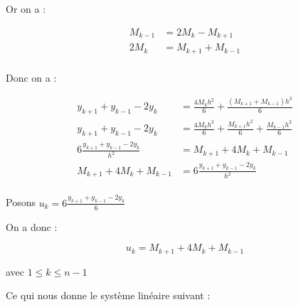 \documentclass[12pt, letterpaper]{article}
\begin{document}
\begin{enumerate}
\begin{enumerate}
    Or on a :

    \begin{equation*}
      \begin{split}
        M_{k - 1} & = 2 M_k - M_{k + 1} \\
        2 M_k & =M_{k + 1} + M_{k - 1} \\
      \end{split}
    \end{equation*}
  \end{enumerate}

  Donc on a :

    \begin{equation*}
      \begin{split}
        y_{k + 1} + y_{k - 1} - 2 y_k & = \frac{4 M_k h^2}{6} +
        \frac{(M_{k + 1} + M_{k - 1}) h^2}{6}\\
        y_{k + 1} + y_{k - 1} - 2 y_k & = \frac{4 M_k h^2}{6} +
        \frac{M_{k + 1} h^2}{6} + \frac{M_{k - 1} h^2}{6}\\
        6 \frac{y_{k + 1} + y_{k - 1} - 2 y_k}{h^2} & = M_{k + 1} + 4
        M_k + M_{k - 1} \\
        M_{k + 1} + 4  M_k + M_{k - 1} & = 6 \frac{y_{k + 1} + y_{k - 1} - 2 y_k}{h^2} \\
      \end{split}
    \end{equation*}

    Posons $u_k = 6 \frac{y_{k + 1} + y_{k - 1} - 2
      y_k}{6}$ \newline

    On a donc :

    \begin{equation*}
      u_k = M_{k + 1} + 4  M_k + M_{k - 1}
    \end{equation*}

    avec $1 \le k \le n - 1$ \newline

    Ce qui nous donne le système linéaire suivant :


\end{enumerate}
\end{document}
